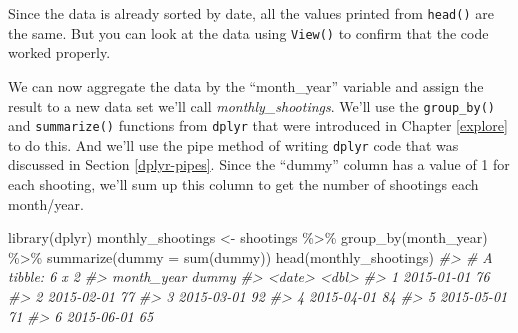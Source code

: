 \documentclass[
]{krantz}
\makeatletter
\newenvironment{Shaded}{\begin{snugshade}}{\end{snugshade}}
\newcommand{\AttributeTok}[1]{\textcolor[rgb]{0.61,0.61,0.61}{#1}}
\newcommand{\CommentTok}[1]{\textcolor[rgb]{0.37,0.37,0.37}{\textit{#1}}}
\newcommand{\FunctionTok}[1]{\textcolor[rgb]{0,0,0}{#1}}
\newcommand{\NormalTok}[1]{#1}
\newcommand{\OtherTok}[1]{\textcolor[rgb]{0.37,0.37,0.37}{#1}}
\newcommand{\SpecialCharTok}[1]{\textcolor[rgb]{0,0,0}{#1}}
\newcommand{\StringTok}[1]{\textcolor[rgb]{0.5,0.5,0.5}{#1}}
\newenvironment{kframe}{%
\medskip{}
\setlength{\fboxsep}{.8em}
 \def\at@end@of@kframe{}%
 \ifinner\ifhmode%
  \def\at@end@of@kframe{\end{minipage}}%
  \begin{minipage}{\columnwidth}%
 \fi\fi%
 \def\FrameCommand##1{\hskip\@totalleftmargin \hskip-\fboxsep
 \colorbox{shadecolor}{##1}\hskip-\fboxsep
     \hskip-\linewidth \hskip-\@totalleftmargin \hskip\columnwidth}%
 \MakeFramed {\advance\hsize-\width
   \@totalleftmargin\z@ \linewidth\hsize
   \@setminipage}}%
 {\par\unskip\endMakeFramed%
 \at@end@of@kframe}
\renewenvironment{Shaded}{\begin{kframe}}{\end{kframe}}
\makeatother
\begin{document}
\begin{Shaded}
\end{Shaded}

Since the data is already sorted by date, all the values
printed from \texttt{head()} are the same. But you can look
at the data using \texttt{View()} to confirm that the code
worked properly.

We can now aggregate the data by the ``month\_year''
variable and assign the result to a new data set we'll call
\emph{monthly\_shootings}. We'll use the
\texttt{group\_by()} and \texttt{summarize()} functions from
\texttt{dplyr} that were introduced in Chapter \ref{explore}
to do this. And we'll use the pipe method of writing
\texttt{dplyr} code that was discussed in Section
\ref{dplyr-pipes}. Since the ``dummy'' column has a value of
1 for each shooting, we'll sum up this column to get the
number of shootings each month/year.

\begin{Shaded}
\begin{Highlighting}[]
\FunctionTok{library}\NormalTok{(dplyr)}
\NormalTok{monthly\_shootings }\OtherTok{\textless{}{-}}\NormalTok{ shootings }\SpecialCharTok{\%\textgreater{}\%}
  \FunctionTok{group\_by}\NormalTok{(month\_year) }\SpecialCharTok{\%\textgreater{}\%}
  \FunctionTok{summarize}\NormalTok{(}\AttributeTok{dummy =} \FunctionTok{sum}\NormalTok{(dummy))}
\FunctionTok{head}\NormalTok{(monthly\_shootings)}
\CommentTok{\#\textgreater{} \# A tibble: 6 x 2}
\CommentTok{\#\textgreater{}   month\_year dummy}
\CommentTok{\#\textgreater{}   \textless{}date\textgreater{}     \textless{}dbl\textgreater{}}
\CommentTok{\#\textgreater{} 1 2015{-}01{-}01    76}
\CommentTok{\#\textgreater{} 2 2015{-}02{-}01    77}
\CommentTok{\#\textgreater{} 3 2015{-}03{-}01    92}
\CommentTok{\#\textgreater{} 4 2015{-}04{-}01    84}
\CommentTok{\#\textgreater{} 5 2015{-}05{-}01    71}
\CommentTok{\#\textgreater{} 6 2015{-}06{-}01    65}
\end{Highlighting}
\end{Shaded}
\end{document}
